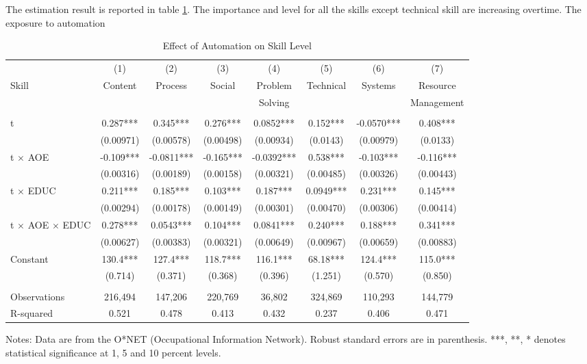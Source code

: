 \documentclass[12pt]{article}
\begin{document}
The estimation result is reported in table \ref{estimation3}. The importance and level for all the skills except technical skill are increasing overtime. The exposure to automation 
\begin{table}[h!]
\begin{center}
\scriptsize
\begin{tabular}{lccccccc} \hline \hline
 & (1) & (2) & (3) & (4) & (5) & (6) & (7) \\
Skill & Content & Process & Social & Problem& Technical & Systems & Resource\\ 
 & &  & & Solving &  & & Management \\ \hline
 &  &  &  &  &  &  &  \\
t & 0.287*** & 0.345*** & 0.276*** & 0.0852*** & 0.152*** & -0.0570*** & 0.408*** \\
 & (0.00971) & (0.00578) & (0.00498) & (0.00934) & (0.0143) & (0.00979) & (0.0133) \\
t $\times$ AOE& -0.109*** & -0.0811*** & -0.165*** & -0.0392*** & 0.538*** & -0.103*** & -0.116*** \\
 & (0.00316) & (0.00189) & (0.00158) & (0.00321) & (0.00485) & (0.00326) & (0.00443) \\
t $\times$ EDUC & 0.211*** & 0.185*** & 0.103*** & 0.187*** & 0.0949*** & 0.231*** & 0.145*** \\
 & (0.00294) & (0.00178) & (0.00149) & (0.00301) & (0.00470) & (0.00306) & (0.00414) \\
t $\times$ AOE $\times$ EDUC & 0.278*** & 0.0543*** & 0.104*** & 0.0841*** & 0.240*** & 0.188*** & 0.341*** \\
 & (0.00627) & (0.00383) & (0.00321) & (0.00649) & (0.00967) & (0.00659) & (0.00883) \\
Constant & 130.4*** & 127.4*** & 118.7*** & 116.1*** & 68.18*** & 124.4*** & 115.0*** \\
 & (0.714) & (0.371) & (0.368) & (0.396) & (1.251) & (0.570) & (0.850) \\
 &  &  &  &  &  &  &  \\
Observations & 216,494 & 147,206 & 220,769 & 36,802 & 324,869 & 110,293 & 144,779 \\
 R-squared & 0.521 & 0.478 & 0.413 & 0.432 & 0.237 & 0.406 & 0.471 \\ \hline
\end{tabular}
\end{center}
\caption{Effect of Automation on Skill Level}
\label{estimation3}
{\scriptsize Notes: Data are from the O*NET (Occupational Information Network). Robust standard errors are in parenthesis. ***, **, * denotes statistical significance at 1, 5 and 10 percent levels.}
\end{table}
\end{document}
